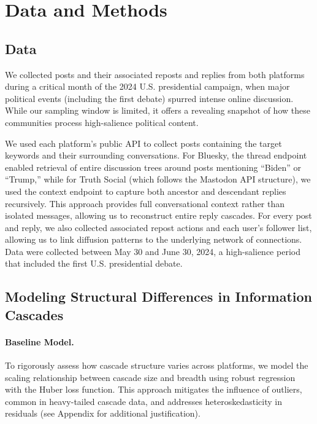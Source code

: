 \documentclass[letterpaper]{article} %
\begin{document}

\section{Data and Methods}
\subsection{Data}
We collected posts and their associated reposts and replies from both platforms during a critical month of the 2024 U.S. presidential campaign, when major political events (including the first debate) spurred intense online discussion. While our sampling window is limited, it offers a revealing snapshot of how these communities process high-salience political content.

We used each platform’s public API to collect posts containing the target keywords and their surrounding conversations.
For Bluesky, the thread endpoint enabled retrieval of entire discussion trees around posts mentioning “Biden” or “Trump,” while for Truth Social (which follows the Mastodon API structure), we used the context endpoint to capture both ancestor and descendant replies recursively.
This approach provides full conversational context rather than isolated messages, allowing us to reconstruct entire reply cascades. For every post and reply, we also collected associated repost actions and each user’s follower list, allowing us to link diffusion patterns to the underlying network of connections. Data were collected between May 30 and June 30, 2024, a high-salience period that included the first U.S. presidential debate.

\subsection{Modeling Structural Differences in Information Cascades}

\paragraph*{Baseline Model.}

To rigorously assess how cascade structure varies across platforms, we model the scaling relationship between cascade size and breadth using robust regression with the Huber loss function. This approach mitigates the influence of outliers, common in heavy-tailed cascade data, and addresses heteroskedasticity in residuals (see Appendix for additional justification).
\end{document}
